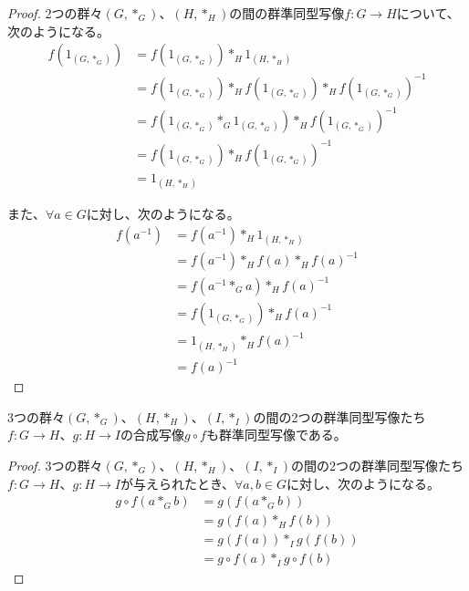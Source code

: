 \documentclass[dvipdfmx]{jsarticle}
\begin{document}
\begin{proof}
2つの群々$\left( G,*_{G} \right)$、$\left( H,*_{H} \right)$の間の群準同型写像$f:G \rightarrow H$について、次のようになる。
\begin{align*}
f\left( 1_{\left( G,*_{G} \right)} \right) &= f\left( 1_{\left( G,*_{G} \right)} \right)*_{H}1_{\left( H,*_{H} \right)}\\
&= f\left( 1_{\left( G,*_{G} \right)} \right)*_{H}f\left( 1_{\left( G,*_{G} \right)} \right)*_{H}f\left( 1_{\left( G,*_{G} \right)} \right)^{- 1}\\
&= f\left( 1_{\left( G,*_{G} \right)}*_{G}1_{\left( G,*_{G} \right)} \right)*_{H}f\left( 1_{\left( G,*_{G} \right)} \right)^{- 1}\\
&= f\left( 1_{\left( G,*_{G} \right)} \right)*_{H}f\left( 1_{\left( G,*_{G} \right)} \right)^{- 1}\\
&= 1_{\left( H,*_{H} \right)}
\end{align*}\par
また、$\forall a \in G$に対し、次のようになる。
\begin{align*}
f\left( a^{- 1} \right) &= f\left( a^{- 1} \right)*_{H}1_{\left( H,*_{H} \right)}\\
&= f\left( a^{- 1} \right)*_{H}f(a)*_{H}{f(a)}^{- 1}\\
&= f\left( a^{- 1}*_{G}a \right)*_{H}{f(a)}^{- 1}\\
&= f\left( 1_{\left( G,*_{G} \right)} \right)*_{H}{f(a)}^{- 1}\\
&= 1_{\left( H,*_{H} \right)}*_{H}{f(a)}^{- 1}\\
&= {f(a)}^{- 1}
\end{align*}
\end{proof}
\begin{thm}\label{3.1.2.2}
3つの群々$\left( G,*_{G} \right)$、$\left( H,*_{H} \right)$、$\left( I,*_{I} \right)$の間の2つの群準同型写像たち$f:G \rightarrow H$、$g:H \rightarrow I$の合成写像$g \circ f$も群準同型写像である。
\end{thm}
\begin{proof}
3つの群々$\left( G,*_{G} \right)$、$\left( H,*_{H} \right)$、$\left( I,*_{I} \right)$の間の2つの群準同型写像たち$f:G \rightarrow H$、$g:H \rightarrow I$が与えられたとき、$\forall a,b \in G$に対し、次のようになる。
\begin{align*}
g \circ f\left( a*_{G}b \right) &= g\left( f\left( a*_{G}b \right) \right)\\
&= g\left( f(a)*_{H}f(b) \right)\\
&= g\left( f(a) \right)*_{I}g\left( f(b) \right)\\
&= g \circ f(a)*_{I}g \circ f(b)
\end{align*}
\end{proof}
\end{document}

